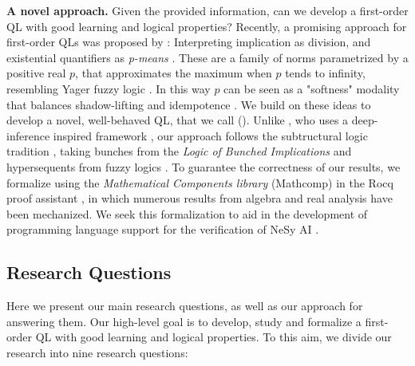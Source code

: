 \textbf{A novel approach.} Given the provided information, can we develop a first-order QL with good learning and logical properties?   Recently, a promising approach for first-order QLs was proposed by \citeauthor{capucci2024quantifiers}: 
Interpreting implication as division, and existential quantifiers as \textit{p-means} \citep{capucci2024quantifiers}. These are a family of norms parametrized by a positive real $p$, that approximates the maximum when $p$ tends to infinity, resembling Yager fuzzy logic \citep{cintula2011handbook}. In this way $p$ can be seen as a "softness" modality that balances shadow-lifting and idempotence \citep{capucci2024quantifiers}. We build on these ideas to develop a novel, well-behaved QL, that we call \emph{\OurLogic} (\OL). Unlike \citeauthor{capucci2024quantifiers}, who uses a deep-inference inspired framework \citep{guglielmi2007system, guglielmi2015deep}, our approach follows the subtructural logic tradition \citep{galatos2007residuated}, taking bunches from the \textit{Logic of Bunched Implications} \citep{o1999logic}  and hypersequents from fuzzy logics \citep{cintula2011handbook, prooffuzzy}. To guarantee the correctness of our results, we formalize using the \textit{Mathematical Components library} (Mathcomp) in the Rocq proof assistant \citep{mathcomp}, in which numerous results from algebra and real analysis have been mechanized. We seek this formalization to aid in the development of programming language support for the verification of NeSy AI \citep{vehicle}. 

\subsection{Research Questions}

Here we present our main research questions, as well as our approach for answering them. Our high-level goal is to develop, study and formalize a first-order QL with good learning and logical properties. To this aim, we divide our research into nine research questions:

